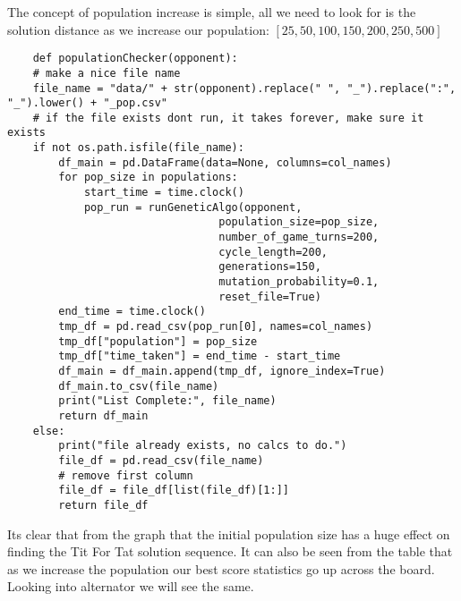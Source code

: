 The concept of population increase is simple, all we need to look for is the solution distance as we increase our population: \([25,50,100,150,200,250,500]\)

\begin{lstlisting}    
    def populationChecker(opponent):
    # make a nice file name
    file_name = "data/" + str(opponent).replace(" ", "_").replace(":", "_").lower() + "_pop.csv"
    # if the file exists dont run, it takes forever, make sure it exists 
    if not os.path.isfile(file_name):
        df_main = pd.DataFrame(data=None, columns=col_names)
        for pop_size in populations:
            start_time = time.clock()
            pop_run = runGeneticAlgo(opponent,
                                 population_size=pop_size,
                                 number_of_game_turns=200,
                                 cycle_length=200,
                                 generations=150,
                                 mutation_probability=0.1,
                                 reset_file=True)
        end_time = time.clock()
        tmp_df = pd.read_csv(pop_run[0], names=col_names)
        tmp_df["population"] = pop_size
        tmp_df["time_taken"] = end_time - start_time
        df_main = df_main.append(tmp_df, ignore_index=True)
        df_main.to_csv(file_name)
        print("List Complete:", file_name)
        return df_main
    else:
        print("file already exists, no calcs to do.")
        file_df = pd.read_csv(file_name)
        # remove first column
        file_df = file_df[list(file_df)[1:]]
        return file_df
\end{lstlisting}
    

Its clear that from the graph that the initial population size has a huge effect on finding the Tit For Tat solution sequence. It can also be seen from the table that as we increase the population our best score statistics go up across the board. Looking into alternator we will see the same.\\

